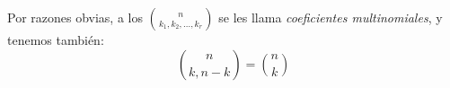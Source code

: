   Por razones obvias,
  a los \(\binom{n}{k_1, k_2, \dotsc, k_r}\)
  se les llama \emph{coeficientes multinomiales},%
  y tenemos también:
  \begin{equation*}
    \binom{n}{k, n - k} = \binom{n}{k}
  \end{equation*}









